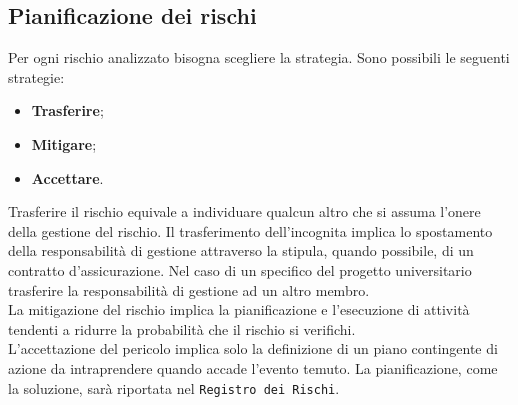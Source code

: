 \documentclass[12pt,a4paper,titlepage]{article}
\begin{document}
	\subsection{Pianificazione dei rischi}
		Per ogni rischio analizzato bisogna scegliere la strategia. Sono possibili le seguenti strategie:
		\begin{itemize}
			\item \textbf{Trasferire};
			\item \textbf{Mitigare};
			\item \textbf{Accettare}.
		\end{itemize}
		Trasferire il rischio equivale a individuare qualcun altro che si assuma l'onere della gestione del rischio.
		Il trasferimento dell'incognita implica lo spostamento della responsabilità di gestione attraverso la stipula, quando possibile, di un contratto d'assicurazione. Nel caso di un specifico del progetto universitario trasferire la responsabilità di gestione ad un altro membro.\\
		La mitigazione del rischio implica la pianificazione e l'esecuzione di attività tendenti a ridurre la probabilità che il rischio si verifichi.\\
		L'accettazione del pericolo implica solo la definizione di un piano contingente di azione da intraprendere quando accade l'evento temuto. La pianificazione, come la soluzione, sarà riportata nel \texttt{Registro dei Rischi}.
	
\end{document}
